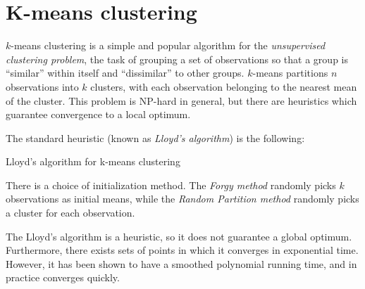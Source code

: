 \documentclass[../tech_report_1.tex]{subfiles}
\begin{document}
\section*{K-means clustering}

$k$-means clustering is a simple and popular algorithm for the \textit{unsupervised clustering
problem}, the task of grouping a set of observations so that a group
is ``similar'' within itself and ``dissimilar'' to other groups.
$k$-means partitions $n$ observations into $k$ clusters, with each
observation belonging to the nearest mean of the cluster. This problem
is NP-hard in general, but there are heuristics which guarantee convergence
to a local optimum.

The standard heuristic (known as \textit{Lloyd's algorithm}) is the
following:

\begin{algorithm}
\caption{Lloyd's algorithm for k-means clustering}


\begin{algorithmic}[1]
\EndWhile
\end{algorithmic} 
\end{algorithm}


There is a choice of initialization method. The \textit{Forgy method}
randomly picks $k$ observations as initial means, while the \textit{Random
Partition method} randomly picks a cluster for each observation.

The Lloyd's algorithm is a heuristic, so it does not guarantee a global
optimum. Furthermore, there exists sets of points in which it converges
in exponential time. However, it has been shown to have a smoothed
polynomial running time, and in practice converges quickly.
\end{document}
